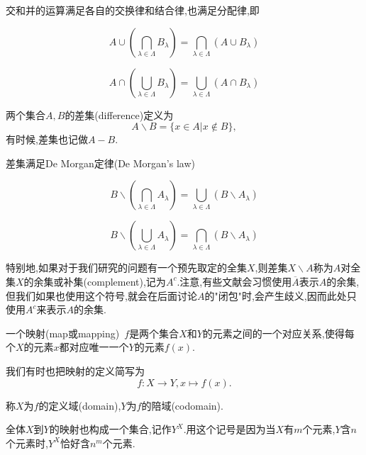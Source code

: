 交和并的运算满足各自的交换律和结合律,也满足分配律,即
\begin{blist}
	\item \begin{equation}
	A\cup\left(\bigcap_{\lambda\in\Lambda}B_{\lambda} \right) = \bigcap_{\lambda\in\Lambda} \left(A\cup B_{\lambda} \right)
	\end{equation}
	\item \begin{equation}
	A\cap\left(\bigcup_{\lambda\in\Lambda}B_{\lambda} \right) = \bigcup_{\lambda\in\Lambda} \left(A\cap B_{\lambda} \right)
	\end{equation}
\end{blist}
两个集合$A,B$的差集(difference)定义为\begin{equation}
A\backslash B = \{x\in A|x\notin B \},
\end{equation}
有时候,差集也记做$A-B$.

差集满足De Morgan定律(De Morgan's law)
\begin{blist}
	\item \begin{equation}
	B\backslash\left(\bigcap_{\lambda\in\Lambda}A_{\lambda} \right) = \bigcup_{\lambda\in\Lambda}\left(B\backslash A_\lambda\right)
	\end{equation}
	\item \begin{equation}
	B\backslash\left(\bigcup_{\lambda\in\Lambda}A_{\lambda} \right) = \bigcap_{\lambda\in\Lambda}\left(B\backslash A_\lambda\right)
	\end{equation}
\end{blist}
特别地,如果对于我们研究的问题有一个预先取定的全集$X$,则差集$X\backslash A$称为$A$对全集$X$的余集或补集(complement),记为$A^{c}$.注意,有些文献会习惯使用$\overline{A}$表示$A$的余集,但我们如果也使用这个符号,就会在后面讨论$A$的"闭包"时,会产生歧义,因而此处只使用$A^{c}$来表示$A$的余集.


\begin{definition}[映射]
	\begin{blist}
		\item 一个映射(map或mapping)~$f$是两个集合$X$和$Y$的元素之间的一个对应关系,使得每个$X$的元素$x$都对应唯一一个$Y$的元素$f(x)$.
		\item 我们有时也把映射的定义简写为\begin{equation}
		f:X\rightarrow Y,x\mapsto f(x).
		\end{equation}
		\item 称$X$为$f$的定义域(domain),$Y$为$f$的陪域(codomain).
		\item 全体$X$到$Y$的映射也构成一个集合,记作$Y^X$.用这个记号是因为当$X$有$m$个元素,$Y$含$n$个元素时,$Y^X$恰好含$n^m$个元素.
	\end{blist}	
\end{definition}

